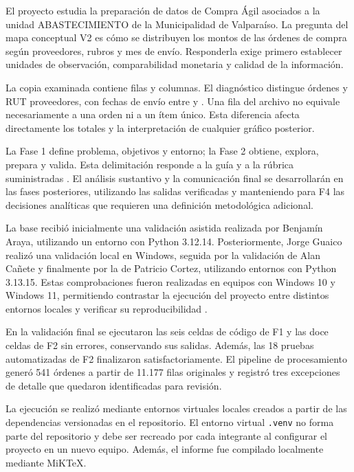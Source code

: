 \documentclass[12pt,letterpaper]{article}
\begin{document}
El proyecto estudia la preparación de datos de Compra Ágil asociados a la unidad
ABASTECIMIENTO de la Municipalidad de Valparaíso. La pregunta del mapa conceptual
V2 es cómo se distribuyen los montos de las órdenes de compra según proveedores,
rubros y mes de envío. Responderla exige primero establecer unidades de observación,
comparabilidad monetaria y calidad de la información.

La copia examinada contiene \FilasOriginal{} filas y \ColumnasOriginal{} columnas.
El diagnóstico distingue \Ordenes{} órdenes y \Proveedores{} RUT proveedores,
con fechas de envío entre \FechaMin{} y \FechaMax{}. Una fila del archivo no equivale
necesariamente a una orden ni a un ítem único. Esta diferencia afecta directamente
los totales y la interpretación de cualquier gráfico posterior.

La Fase 1 define problema, objetivos y entorno; la Fase 2 obtiene, explora, prepara
y valida. Esta delimitación responde a la guía y a la rúbrica suministradas
\citep{guia,rubrica}. El análisis sustantivo y la comunicación final se desarrollarán
en las fases posteriores, utilizando las salidas verificadas y manteniendo para F4 las
decisiones analíticas que requieren una definición metodológica adicional.

La base recibió inicialmente una validación asistida realizada por Benjamín
Araya, utilizando un entorno con Python 3.12.14. Posteriormente, Jorge Guaico
realizó una validación local en Windows, seguida por la validación de Alan
Cañete y finalmente por la de Patricio Cortez, utilizando entornos con Python
3.13.15. Estas comprobaciones fueron realizadas en equipos con Windows 10 y
Windows 11, permitiendo contrastar la ejecución del proyecto entre distintos
entornos locales y verificar su reproducibilidad \cite{peng2011,sandve2013}.

En la validación final se ejecutaron las seis celdas de código de F1 y las
doce celdas de F2 sin errores, conservando sus salidas. Además, las 18 pruebas
automatizadas de F2 finalizaron satisfactoriamente. El pipeline de
procesamiento generó 541 órdenes a partir de 11.177 filas originales y
registró tres excepciones de detalle que quedaron identificadas para revisión.


La ejecución se realizó mediante entornos virtuales locales creados a partir
de las dependencias versionadas en el repositorio. El entorno virtual
\texttt{.venv} no forma parte del repositorio y debe ser recreado por cada
integrante al configurar el proyecto en un nuevo equipo. Además, el informe
fue compilado localmente mediante MiKTeX.
\end{document}
